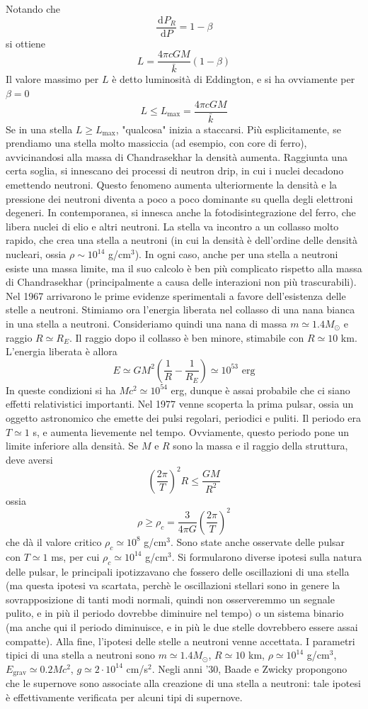 \documentclass[a4paper,11pt]{article}
\renewcommand{\d}{\mathrm{d}} %
\newcommand{\der}[3][]{\frac{\d ^{#1}#2}{\d {#3}^{#1}}} %
\newcommand{\s}{_\odot}
\renewcommand{\d}{\,\mathrm{d}}
\theoremstyle{theorem}
\theoremstyle{definition}
\begin{document}
\begin{itemize}
		Notando che
		\[\der{P_R}{P}=1-\beta\]
		si ottiene
		\[L=\frac{4\pi cGM}{\bar{k}}(1-\beta)\]
		Il valore massimo per $L$ è detto luminosità di Eddington, e si ha ovviamente per $\beta=0$
		\[L\leq L_{\textrm{max}}=\frac{4\pi cGM}{\bar{k}}\]
		Se in una stella $L\geq L_\textrm{max}$, "qualcosa" inizia a staccarsi. Più esplicitamente, se prendiamo una stella molto massiccia (ad esempio, con core di ferro), avvicinandosi alla massa di Chandrasekhar la densità aumenta. Raggiunta una certa soglia, si innescano dei processi di neutron drip, in cui i nuclei decadono emettendo neutroni. Questo fenomeno aumenta ulteriormente la densità e la pressione dei neutroni diventa a poco a poco dominante su quella degli elettroni degeneri. In contemporanea, si innesca anche la fotodisintegrazione del ferro, che libera nuclei di elio e altri neutroni. La stella va incontro a un collasso molto rapido, che crea una stella a neutroni (in cui la densità è dell'ordine delle densità nucleari, ossia $\rho\sim10^{14}$ g/cm$^3$). In ogni caso, anche per una stella a neutroni esiste una massa limite, ma il suo calcolo è ben più complicato rispetto alla massa di Chandrasekhar (principalmente a causa delle interazioni non più trascurabili). Nel 1967 arrivarono le prime evidenze sperimentali a favore dell'esistenza delle stelle a neutroni. Stimiamo ora l'energia liberata nel collasso di una nana bianca in una stella a neutroni. Consideriamo quindi una nana di massa $m\simeq 1.4M\s$ e raggio $R\simeq R_E$. Il raggio dopo il collasso è ben minore, stimabile con $R\simeq 10$ km. L'energia liberata è allora
		\[E\simeq GM^2\left(\frac{1}{R}-\frac{1}{R_E}\right)\simeq 10^{53}\textrm{ erg}\]
		In queste condizioni si ha $Mc^2\simeq10^54$ erg, dunque è assai probabile che ci siano effetti relativistici importanti. Nel 1977 venne scoperta la prima pulsar, ossia un oggetto astronomico che emette dei pulsi regolari, periodici e puliti. Il periodo era $T\simeq 1$ s, e aumenta lievemente nel tempo. Ovviamente, questo periodo pone un limite inferiore alla densità. Se $M$ e $R$ sono la massa e il raggio della struttura, deve aversi
		\[\left(\frac{2\pi}{T}\right)^2R\leq\frac{GM}{R^2}\]
		ossia
		\[\rho\geq\rho_c=\frac{3}{4\pi G}\left(\frac{2\pi}{T}\right)^2\]
		che dà il valore critico $\rho_c\simeq10^{8}$ g/cm$^3$. Sono state anche osservate delle pulsar con $T\simeq 1$ ms, per cui $\rho_c\simeq10^{14}$ g/cm$^3$. Si formularono diverse ipotesi sulla natura delle pulsar, le principali ipotizzavano che fossero delle oscillazioni di una stella (ma questa ipotesi va scartata, perchè le oscillazioni stellari sono in genere la sovrapposizione di tanti modi normali, quindi non osserveremmo un segnale pulito, e in più il periodo dovrebbe diminuire nel tempo) o un sistema binario (ma anche qui il periodo diminuisce, e in più le due stelle dovrebbero essere assai compatte). Alla fine, l'ipotesi delle stelle a neutroni venne accettata. I parametri tipici di una stella a neutroni sono $m\simeq1.4 M\s$, $R\simeq 10$ km, $\rho\simeq 10^{14}$ g/cm$^3$, $E_\textrm{grav}\simeq 0.2 Mc^2$, $g\simeq 2\cdot10^{14}$ cm/s$^2$. Negli anni '30, Baade e Zwicky propongono che le supernove sono associate alla creazione di una stella a neutroni: tale ipotesi è effettivamente verificata per alcuni tipi di supernove.

\end{itemize}
\end{document}
